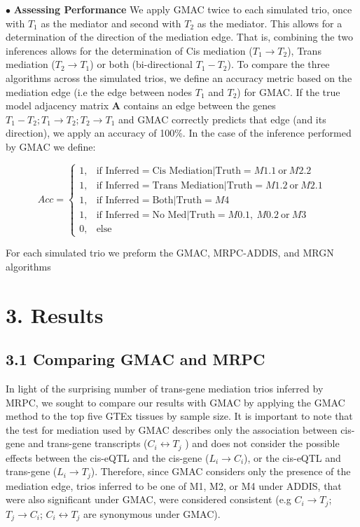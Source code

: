 \documentclass[
]{article}
\begin{document}
\indent \(\bullet\) \textbf{Assessing Performance} We apply GMAC twice
to each simulated trio, once with \(T_1\) as the mediator and second
with \(T_2\) as the mediator. This allows for a determination of the
direction of the mediation edge. That is, combining the two inferences
allows for the determination of Cis mediation (\(T_1 \rightarrow T_2\)),
Trans mediation (\(T_2 \rightarrow T_1\)) or both (bi-directional
\(T_1 - T_2\)). To compare the three algorithms across the simulated
trios, we define an accuracy metric based on the mediation edge (i.e the
edge between nodes \(T_1\) and \(T_2\)) for GMAC. If the true model
adjacency matrix \(\textbf{A}\) contains an edge between the genes
\(T_1 - T_2; T_1 \rightarrow T_2; T_2 \rightarrow T_1\) and GMAC
correctly predicts that edge (and its direction), we apply an accuracy
of 100\%. In the case of the inference performed by GMAC we define:

\[ Acc = \begin{cases} 1, & \text{if Inferred} = \text{Cis Mediation} | \text{Truth} = M1.1 \ \text{or} \ M2.2  \\
                       1, & \text{if Inferred} = \text{Trans Mediation} | \text{Truth} = M1.2 \ \text{or} \ M2.1 \\
                       1, & \text{if Inferred} = \text{Both} | \text{Truth} = M4 \\
                       1, & \text{if Inferred} = \text{No Med} | \text{Truth} = M0.1, \ M0.2 \ \text{or} \ M3  \\
                       0, & \text{else}
                       \end{cases} \]

For each simulated trio we preform the GMAC, MRPC-ADDIS, and MRGN
algorithms

\section*{3. Results}
\subsection*{3.1 Comparing GMAC and MRPC}

In light of the surprising number of trans-gene mediation trios inferred
by MRPC, we sought to compare our results with GMAC by applying the GMAC
method to the top five GTEx tissues by sample size. It is important to
note that the test for mediation used by GMAC describes only the
association between cis-gene and trans-gene transcripts
(\(C_i \leftrightarrow T_j\) ) and does not consider the possible
effects between the cis-eQTL and the cis-gene (\(L_i \rightarrow C_i\)),
or the cis-eQTL and trans-gene (\(L_i \rightarrow T_j\)). Therefore,
since GMAC considers only the presence of the mediation edge, trios
inferred to be one of M1, M2, or M4 under ADDIS, that were also
significant under GMAC, were considered consistent (e.g
\(C_i \rightarrow T_j\); \(T_j \rightarrow C_i\);
\(C_i \leftrightarrow T_j\) are synonymous under GMAC).
\end{document}
